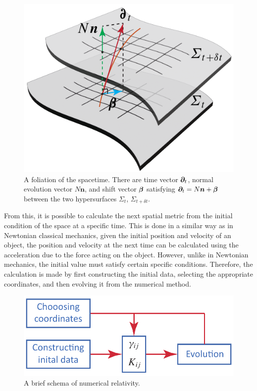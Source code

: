 \begin{figure}[H]
	\centering
	\includegraphics{Figures/foliation.pdf}
	\caption{A foliation of the spacetime. There are time vector $\bm{\partial}_t$, normal evolution vector $N\bm{n}$, and shift vector $\bm{\beta}$ satisfying $\bm{\partial}_t = N\bm{n} + \bm{\beta}$ between the two hypersurfaces $\Sigma_t$, $\Sigma_{t+\delta t}$.}
	\label{fig:foliation}
\end{figure}

From this, it is possible to calculate the next spatial metric from the initial condition of the space at a specific time. This is done in a similar way as in Newtonian classical mechanics, given the initial position and velocity of an object, the position and velocity at the next time can be calculated using the acceleration due to the force acting on the object. However, unlike in Newtonian mechanics, the initial value must satisfy certain specific conditions. Therefore, the calculation is made by first constructing the initial data, selecting the appropriate coordinates, and then evolving it from the numerical method.

\begin{figure}[H]
	\centering
	\includegraphics{Figures/scheme.pdf}
	\caption{A brief schema of numerical relativity.}
	\label{fig:scheme}
\end{figure}

